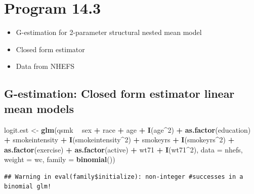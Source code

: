 \documentclass[
  10pt,
]{book}
\newenvironment{Shaded}{\begin{snugshade}}{\end{snugshade}}
\newcommand{\DataTypeTok}[1]{\textcolor[rgb]{0.13,0.29,0.53}{#1}}
\newcommand{\DecValTok}[1]{\textcolor[rgb]{0.00,0.00,0.81}{#1}}
\newcommand{\KeywordTok}[1]{\textcolor[rgb]{0.13,0.29,0.53}{\textbf{#1}}}
\newcommand{\NormalTok}[1]{#1}
\newcommand{\OperatorTok}[1]{\textcolor[rgb]{0.81,0.36,0.00}{\textbf{#1}}}
\newcommand{\StringTok}[1]{\textcolor[rgb]{0.31,0.60,0.02}{#1}}
\providecommand{\tightlist}{%
  \setlength{\itemsep}{0pt}\setlength{\parskip}{0pt}}
\begin{document}
\hypertarget{program-14.3}{%
\section{Program 14.3}\label{program-14.3}}

\begin{itemize}
\tightlist
\item
  G-estimation for 2-parameter structural nested mean model
\item
  Closed form estimator
\item
  Data from NHEFS
\end{itemize}

\hypertarget{g-estimation-closed-form-estimator-linear-mean-models}{%
\subsection{G-estimation: Closed form estimator linear mean models}\label{g-estimation-closed-form-estimator-linear-mean-models}}

\begin{Shaded}
\begin{Highlighting}[]
\NormalTok{logit.est <-}\StringTok{ }\KeywordTok{glm}\NormalTok{(qsmk }\OperatorTok{~}\StringTok{ }\NormalTok{sex }\OperatorTok{+}\StringTok{ }\NormalTok{race }\OperatorTok{+}\StringTok{ }\NormalTok{age }\OperatorTok{+}\StringTok{ }\KeywordTok{I}\NormalTok{(age}\OperatorTok{^}\DecValTok{2}\NormalTok{) }\OperatorTok{+}\StringTok{ }\KeywordTok{as.factor}\NormalTok{(education) }
                 \OperatorTok{+}\StringTok{ }\NormalTok{smokeintensity }\OperatorTok{+}\StringTok{ }\KeywordTok{I}\NormalTok{(smokeintensity}\OperatorTok{^}\DecValTok{2}\NormalTok{) }\OperatorTok{+}\StringTok{ }\NormalTok{smokeyrs }
                 \OperatorTok{+}\StringTok{ }\KeywordTok{I}\NormalTok{(smokeyrs}\OperatorTok{^}\DecValTok{2}\NormalTok{) }\OperatorTok{+}\StringTok{ }\KeywordTok{as.factor}\NormalTok{(exercise) }\OperatorTok{+}\StringTok{ }\KeywordTok{as.factor}\NormalTok{(active) }
                 \OperatorTok{+}\StringTok{ }\NormalTok{wt71 }\OperatorTok{+}\StringTok{ }\KeywordTok{I}\NormalTok{(wt71}\OperatorTok{^}\DecValTok{2}\NormalTok{), }\DataTypeTok{data =}\NormalTok{ nhefs, }\DataTypeTok{weight =}\NormalTok{ wc, }
                 \DataTypeTok{family =} \KeywordTok{binomial}\NormalTok{())}
\end{Highlighting}
\end{Shaded}

\begin{verbatim}
## Warning in eval(family$initialize): non-integer #successes in a binomial glm!
\end{verbatim}
\end{document}
